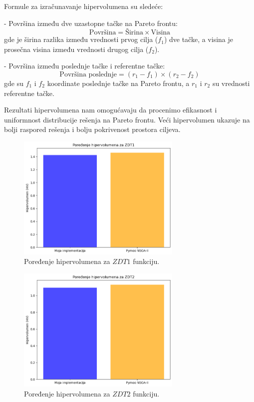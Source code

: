 \documentclass[12pt]{article}
\begin{document}
Formule za izračunavanje hipervolumena su sledeće:

- Površina između dve uzastopne tačke na Pareto frontu:
  \[
  \text{Površina} = \text{Širina} \times \text{Visina}
  \]
  gde je širina razlika između vrednosti prvog cilja (\( f_1 \)) dve tačke, a visina je prosečna visina između vrednosti drugog cilja (\( f_2 \)).

- Površina između poslednje tačke i referentne tačke:
  \[
  \text{Površina poslednje} = (r_1 - f_1) \times (r_2 - f_2)
  \]
  gde su \( f_1 \) i \( f_2 \) koordinate poslednje tačke na Pareto frontu, a \( r_1 \) i \( r_2 \) su vrednosti referentne tačke.

Rezultati hipervolumena nam omogućavaju da procenimo efikasnost i uniformnost distribucije rešenja na Pareto frontu. Veći hipervolumen ukazuje na bolji raspored rešenja i bolju pokrivenost prostora ciljeva.

\begin{figure}[H]
    \centering
    \includegraphics[width=0.7\textwidth]{images/hv_zdt1.png}
    \caption{Poređenje hipervolumena za \( ZDT1 \) funkciju.}
    \label{fig:hv_zdt1}
\end{figure}

\begin{figure}[H]
    \centering
    \includegraphics[width=0.7\textwidth]{images/hv_zdt2.png}
    \caption{Poređenje hipervolumena za \( ZDT2 \) funkciju.}
    \label{fig:hv_zdt2}
\end{figure}
\end{document}
